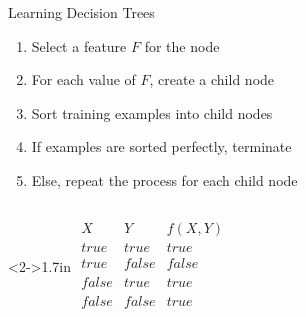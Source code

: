 \documentclass[14pt]{beamer}
\begin{document}
\begin{frame}{Learning Decision Trees}
\begin{enumerate}
\item Select a feature $F$ for the node
\item For each value of $F$, create a child node
\item Sort training examples into child nodes
\item If examples are sorted perfectly, terminate
\item Else, repeat the process for each child node
\end{enumerate}
\begin{columns}
\begin{column}<2->{1.7in}
$
\begin{array}{cc|c}
X          &  Y          & f(X, Y) \\
\hline
\textit{true}  & \textit{true}   & \textit{true} \\
\textit{true}  & \textit{false}  & \textit{false} \\
\textit{false} & \textit{true}   & \textit{true} \\
\textit{false} & \textit{false}  & \textit{true} \\
\end{array}
$
\end{column}
\begin{column}{2.6in}
%
%

\end{column}
\end{columns}
\end{frame}
\end{document}
